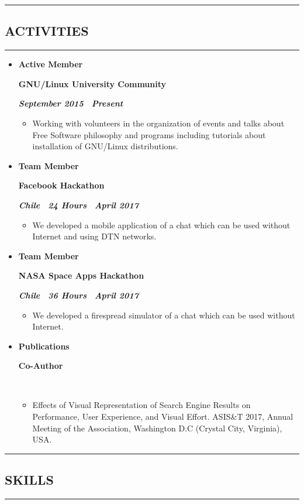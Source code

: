 \documentclass[10pt,letterpaper]{article}
\newcommand{\textbox}[1]{
  \parbox{.333\textwidth}{#1}
}
\newcommand{\CPP}
{C\nolinebreak[4]\hspace{-.05em}\raisebox{.22ex}{\footnotesize\bf ++}}
\newcommand{\sectionTitle}[1]{
  \hrule
  \vspace{-1.0em} 
  \subsection*{\uppercase{\textbf{#1}}}
  \vspace{-0.3em}
    \hrule
    \vspace{0.3em}  
}
\newcommand{\titleExperienceWithoutLocation}[4]{
  \vspace{1.0em}
  \item[]
  {
    \textbox{\textbf{#1}\hfill}\textbox{\hfil \textbf{#2}\hfil}\hfill \textbf{\emph{#3 \textendash \ #4}}
  }
}
\begin{document}
  \vspace{0.30em} 
  \sectionTitle{Activities}
  \vspace{-0.8em}
  \begin{itemize}
    \parskip=-0.6em 
    \titleExperienceWithoutLocation{Active Member}{GNU/Linux University Community}{September 2015}{Present}
      \begin{itemize}[label=\textbullet]
        \itemsep0em
        \item Working with volunteers in the organization of events and talks about Free Software philosophy and programs including tutorials about installation of GNU/Linux distributions.
      \end{itemize}
  
    \vspace{-0.6em} 
    \titleExperienceWithoutLocation{Team Member}{Facebook Hackathon}{Chile \textendash \ 24 Hours}{April 2017}
      \begin{itemize}[label=\textbullet]
        \itemsep0em
        \item We developed a mobile application of a chat which can be used without Internet and using DTN networks.
      \end{itemize}
  
    \vspace{-0.6em} 
    \titleExperienceWithoutLocation{Team Member}{NASA Space Apps Hackathon}{Chile \textendash \ 36 Hours}{April 2017}
      \begin{itemize}[label=\textbullet]
        \itemsep0em
        \item We developed a firespread simulator of a chat which can be used without Internet.
      \end{itemize}

    \vspace{-0.6em} 
    \titleExperienceWithoutLocation{Publications}{Co-Author}{}{}
      \begin{itemize}[label=\textbullet]
        \itemsep0em
        \item Effects of Visual Representation of Search Engine Results on Performance, User Experience, and Visual Effort. ASIS\&T 2017,  Annual Meeting of the Association, Washington D.C (Crystal City, Virginia), USA.
      \end{itemize}
    \end{itemize} 
  \vspace{0.30em} 
  
  \sectionTitle{Skills}
  \vspace{0.20em}
  
\end{document}
